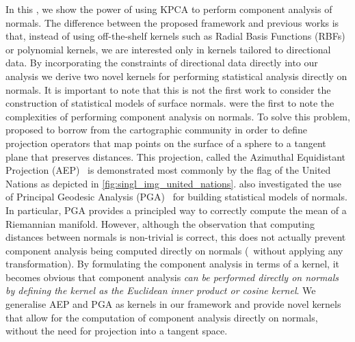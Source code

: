 In this , we show the power of using KPCA to perform
component analysis of normals. The difference between the proposed framework and
previous works is that, instead of using off-the-shelf kernels such as Radial
Basis Functions (RBFs) or polynomial kernels, we are interested only in kernels
tailored to directional data. By incorporating the constraints of directional
data directly into our analysis we derive two novel kernels for performing
statistical analysis directly on normals. It is important to note that this is
not the first work to consider the construction of statistical models of surface
normals. \citet{smith2006recovering,smith2008facial} were the
first to note the complexities of performing component analysis on normals. To
solve this problem, \citet{smith2006recovering,smith2008facial}
proposed to borrow from the cartographic
community in order to define projection operators that map points on the surface
of a sphere to a tangent plane that preserves distances. This projection, called
the Azimuthal Equidistant Projection (AEP)~\cite{snyder1987map} is demonstrated
most commonly by the flag of the United Nations as depicted in
\cref{fig:singl_img_united_nations}.
\citet{smith2008facial} also investigated the use of
Principal Geodesic Analysis (PGA)~\cite{fletcher2004principal,smith2008facial}
for building statistical models of normals. In particular, PGA provides a
principled way to correctly compute the mean of a Riemannian manifold. However,
although the observation that computing distances between normals is non-trivial
is correct, this does not actually prevent component analysis being computed
directly on normals (\ie~without applying any transformation). By formulating
the component analysis in terms of a kernel, it becomes obvious that component
analysis \textit{can be performed directly on normals by defining the kernel as
the Euclidean inner product or cosine kernel}. We generalise AEP and PGA as
kernels in our framework and provide novel kernels that allow for the
computation of component analysis directly on normals, without the need for
projection into a tangent space.

